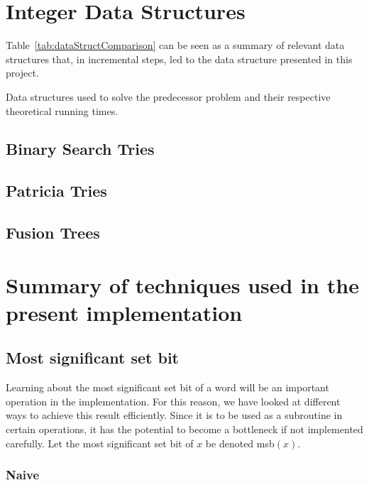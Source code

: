 \section{Integer Data Structures}

Table~\ref{tab:dataStructComparison} can be seen as a summary of relevant data structures that, in incremental steps, led to the data structure presented in this project.

\begin{table}[H]
\centering

\caption[Data structure comparison]{Data structures used to solve the predecessor problem and their respective theoretical running times.}
\label{tab:dataStructComparison}
\end{table}

\subsection{Binary Search Tries}

\subsection{Patricia Tries}

\subsection{Fusion Trees}

\section{Summary of techniques used in the present implementation}

\subsection{Most significant set bit}

Learning about the most significant set bit of a word will be an important operation in the implementation. For this reason, we have looked at different ways to achieve this result efficiently. Since it is to be used as a subroutine in certain operations, it has the potential to become a bottleneck if not implemented carefully. Let the most significant set bit of $x$ be denoted msb$(x)$.

\subsubsection{Naive}


